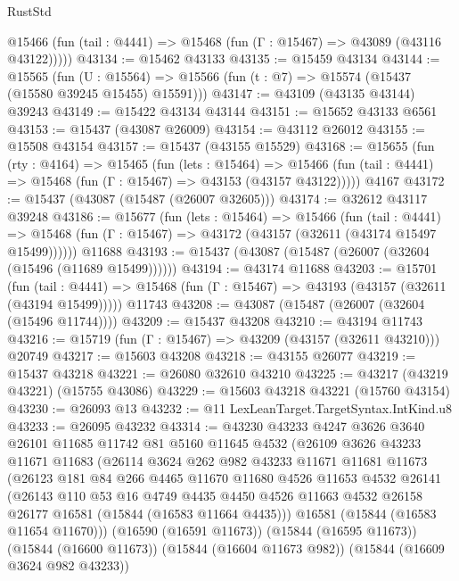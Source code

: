 \begin{lexlean}{RustStd}
\begin{coremodule}
      @15466 (fun (tail : @4441) => @15468 (fun (Γ : @15467) => @43089 (@43116 @43122)))))
@43134 := @15462 @43133
@43135 := @15459 @43134
@43144 := @15565
    (fun (U : @15564) => @15566 (fun (t : @7) => @15574 (@15437 (@15580 @39245 @15455) @15591)))
@43147 := @43109 (@43135 @43144) @39243
@43149 := @15422 @43134 @43144
@43151 := @15652 @43133 @6561
@43153 := @15437 (@43087 @26009)
@43154 := @43112 @26012
@43155 := @15508 @43154
@43157 := @15437 (@43155 @15529)
@43168 := @15655
    (fun (rty : @4164) =>
    @15465
      (fun (lets : @15464) =>
      @15466 (fun (tail : @4441) => @15468 (fun (Γ : @15467) => @43153 (@43157 @43122)))))
    @4167
@43172 := @15437 (@43087 (@15487 (@26007 @32605)))
@43174 := @32612 @43117 @39248
@43186 := @15677
    (fun (lets : @15464) =>
    @15466
      (fun (tail : @4441) =>
      @15468 (fun (Γ : @15467) => @43172 (@43157 (@32611 (@43174 @15497 @15499))))))
    @11688
@43193 := @15437 (@43087 (@15487 (@26007 (@32604 (@15496 (@11689 @15499))))))
@43194 := @43174 @11688
@43203 := @15701
    (fun (tail : @4441) => @15468 (fun (Γ : @15467) => @43193 (@43157 (@32611 (@43194 @15499)))))
    @11743
@43208 := @43087 (@15487 (@26007 (@32604 (@15496 @11744))))
@43209 := @15437 @43208
@43210 := @43194 @11743
@43216 := @15719 (fun (Γ : @15467) => @43209 (@43157 (@32611 @43210))) @20749
@43217 := @15603 @43208
@43218 := @43155 @26077
@43219 := @15437 @43218
@43221 := @26080 @32610 @43210
@43225 := @43217 (@43219 @43221) (@15755 @43086)
@43229 := @15603 @43218 @43221 (@15760 @43154)
@43230 := @26093 @13
@43232 := @11 LexLeanTarget.TargetSyntax.IntKind.u8
@43233 := @26095 @43232
@43314 := @43230
    @43233
    @4247
    @3626
    @3640
    @26101
    @11685
    @11742
    @81
    @5160
    @11645
    @4532
    (@26109
      @3626
      @43233
      @11671
      @11683
      (@26114
        @3624
        @262
        @982
        @43233
        @11671
        @11681
        @11673
        (@26123
          @181
          @84
          @266
          @4465
          @11670
          @11680
          @4526
          @11653
          @4532
          @26141
          (@26143
            @110
            @53
            @16
            @4749
            @4435
            @4450
            @4526
            @11663
            @4532
            @26158
            @26177
            @16581
            (@15844 (@16583 @11664 @4435)))
          @16581
          (@15844 (@16583 @11654 @11670)))
        (@16590 (@16591 @11673))
        (@15844 (@16595 @11673))
        (@15844 (@16600 @11673))
        (@15844 (@16604 @11673 @982))
        (@15844 (@16609 @3624 @982 @43233))

\end{coremodule}
\end{lexlean}

